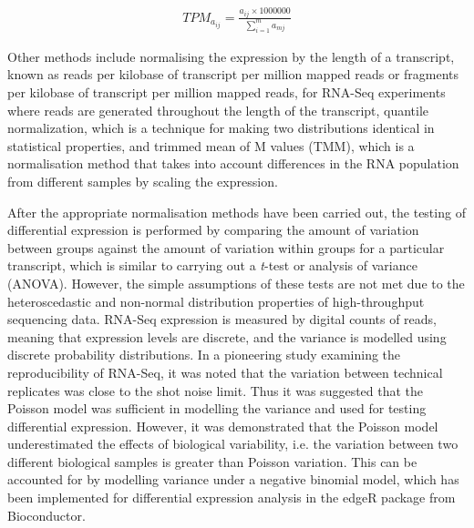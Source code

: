 \begin{align*}
   TPM_{a_{ij}} = \frac{a_{ij} \times 1000000}{\sum_{i=1}^{m}{a_{mj}}}
\end{align*}

Other methods include normalising the expression by the length of a transcript, known as reads per kilobase of transcript per million mapped reads or fragments per kilobase of transcript per million mapped reads, for RNA-Seq experiments where reads are generated throughout the length of the transcript, quantile normalization, which is a technique for making two distributions identical in statistical properties\cite{pmid12538238}, and trimmed mean of M values (TMM), which is a normalisation method that takes into account differences in the RNA population from different samples by scaling the expression\cite{pmid20196867}.

After the appropriate normalisation methods have been carried out, the testing of differential expression is performed by comparing the amount of variation between groups against the amount of variation within groups for a particular transcript, which is similar to carrying out a \textit{t}-test or analysis of variance (ANOVA). However, the simple assumptions of these tests are not met due to the heteroscedastic and non-normal distribution properties of high-throughput sequencing data. RNA-Seq expression is measured by digital counts of reads, meaning that expression levels are discrete, and the variance is modelled using discrete probability distributions. In a pioneering study examining the reproducibility of RNA-Seq, it was noted that the variation between technical replicates was close to the shot noise limit\cite{pmid18550803}. Thus it was suggested that the Poisson model was sufficient in modelling the variance and used for testing differential expression. However, it was demonstrated that the Poisson model underestimated the effects of biological variability, i.e. the variation between two different biological samples is greater than Poisson variation\cite{20979621}. This can be accounted for by modelling variance under a negative binomial model, which has been implemented for differential expression analysis in the edgeR package\cite{pmid19910308} from Bioconductor\cite{pmid15461798}.

